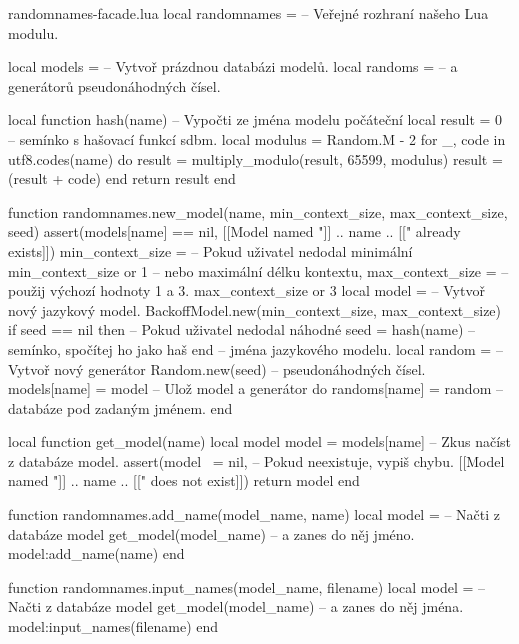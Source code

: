 \documentclass{csbulletin}
\begin{document}
\begin{filecontents}{randomnames-facade.lua}
local randomnames = {}      -- Veřejné rozhraní našeho Lua modulu.

local models = {}           -- Vytvoř prázdnou databázi modelů.
local randoms = {}          -- a generátorů pseudonáhodných čísel.

local function hash(name)   -- Vypočti ze jména modelu počáteční
  local result = 0          -- semínko s hašovací funkcí sdbm.
  local modulus = Random.M - 2
  for _, code in utf8.codes(name) do
    result = multiply_modulo(result, 65599, modulus)
    result = (result + code) %
  end
  return result
end

function randomnames.new_model(name, min_context_size,
                               max_context_size, seed)
  assert(models[name] == nil,
         [[Model named "]] .. name .. [[" already exists]])
  min_context_size =        -- Pokud uživatel nedodal minimální
    min_context_size or 1   -- nebo maximální délku kontextu,
  max_context_size =        -- použij výchozí hodnoty 1 a 3.
    max_context_size or 3
  local model =             -- Vytvoř nový jazykový model.
    BackoffModel.new(min_context_size, max_context_size)
  if seed == nil then       -- Pokud uživatel nedodal náhodné
    seed = hash(name)       -- semínko, spočítej ho jako haš
  end                       -- jména jazykového modelu.
  local random =            -- Vytvoř nový generátor
    Random.new(seed)        -- pseudonáhodných čísel.
  models[name] = model      -- Ulož model a generátor do
  randoms[name] = random    -- databáze pod zadaným jménem.
end

local function get_model(name)
  local model
  model = models[name]      -- Zkus načíst z databáze model.
  assert(model ~= nil,      -- Pokud neexistuje, vypiš chybu.
         [[Model named "]] .. name .. [[" does not exist]])
  return model
end

function randomnames.add_name(model_name, name)
  local model =             -- Načti z databáze model
    get_model(model_name)   -- a zanes do něj jméno.
  model:add_name(name)
end

function randomnames.input_names(model_name, filename)
  local model =             -- Načti z databáze model
    get_model(model_name)   -- a zanes do něj jména.
  model:input_names(filename)
end


\end{filecontents}
\end{document}
